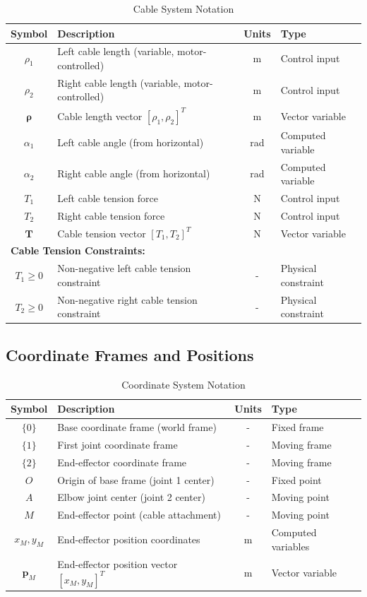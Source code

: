 \begin{table}[h!]
\centering
\caption{Cable System Notation}
\begin{tabular}{|c|l|c|l|}
\hline
\textbf{Symbol} & \textbf{Description} & \textbf{Units} & \textbf{Type} \\
\hline
$\rho_1$ & Left cable length (variable, motor-controlled) & m & Control input \\
$\rho_2$ & Right cable length (variable, motor-controlled) & m & Control input \\
$\bm{\rho}$ & Cable length vector $[\rho_1, \rho_2]^T$ & m & Vector variable \\
$\alpha_1$ & Left cable angle (from horizontal) & rad & Computed variable \\
$\alpha_2$ & Right cable angle (from horizontal) & rad & Computed variable \\
$T_1$ & Left cable tension force & N & Control input \\
$T_2$ & Right cable tension force & N & Control input \\
$\bm{T}$ & Cable tension vector $[T_1, T_2]^T$ & N & Vector variable \\
\hline
\multicolumn{4}{|l|}{\textbf{Cable Tension Constraints:}} \\
\hline
$T_1 \geq 0$ & Non-negative left cable tension constraint & - & Physical constraint \\
$T_2 \geq 0$ & Non-negative right cable tension constraint & - & Physical constraint \\
\hline
\end{tabular}
\end{table}

\subsection{Coordinate Frames and Positions}

\begin{table}[h!]
\centering
\caption{Coordinate System Notation}
\begin{tabular}{|c|l|c|l|}
\hline
\textbf{Symbol} & \textbf{Description} & \textbf{Units} & \textbf{Type} \\
\hline
$\{0\}$ & Base coordinate frame (world frame) & - & Fixed frame \\
$\{1\}$ & First joint coordinate frame & - & Moving frame \\
$\{2\}$ & End-effector coordinate frame & - & Moving frame \\
$O$ & Origin of base frame (joint 1 center) & - & Fixed point \\
$A$ & Elbow joint center (joint 2 center) & - & Moving point \\
$M$ & End-effector point (cable attachment) & - & Moving point \\
$x_M, y_M$ & End-effector position coordinates & m & Computed variables \\
$\bm{p}_M$ & End-effector position vector $[x_M, y_M]^T$ & m & Vector variable \\
\hline
\end{tabular}
\end{table}

